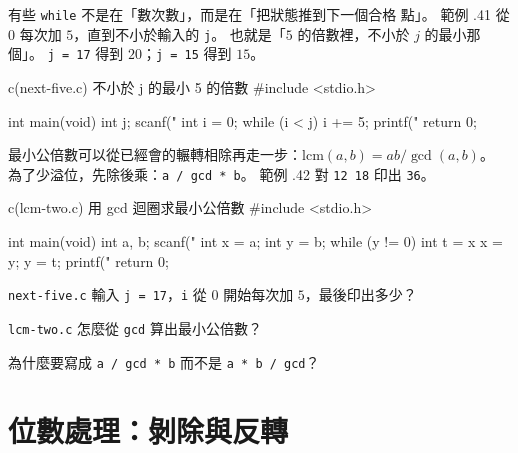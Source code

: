
有些 \texttt{while} 不是在「數次數」，而是在「把狀態推到下一個合格
點」。 範例 \thechapter.41 從 $0$ 每次加 $5$，直到不小於輸入的
\texttt{j}。 也就是「$5$ 的倍數裡，不小於 $j$ 的最小那個」。
\texttt{j = 17} 得到 $20$；\texttt{j = 15} 得到 $15$。

\begin{example}{c}{(next-five.c) 不小於 j 的最小 5 的倍數}
#include <stdio.h>

int main(void) {
    int j;
    scanf("%
    int i = 0;
    while (i < j) {
        i += 5;
    }
    printf("%
    return 0;
}
\end{example}


最小公倍數可以從已經會的輾轉相除再走一步：$\mathrm{lcm}(a,b) =
ab / \gcd(a,b)$。 為了少溢位，先除後乘：\texttt{a / gcd * b}。 範例
\thechapter.42 對 \texttt{12 18} 印出 \texttt{36}。

\begin{example}{c}{(lcm-two.c) 用 gcd 迴圈求最小公倍數}
#include <stdio.h>

int main(void) {
    int a, b;
    scanf("%
    int x = a;
    int y = b;
    while (y != 0) {
        int t = x %
        x = y;
        y = t;
    }
    printf("%
    return 0;
}
\end{example}


\begin{drills}[label=drills:loop-accum-variants]
\item \texttt{next-five.c} 輸入 \texttt{j = 17}，\texttt{i} 從 $0$
開始每次加 $5$，最後印出多少？
\item \texttt{lcm-two.c} 怎麼從 \texttt{gcd} 算出最小公倍數？
\item 為什麼要寫成 \texttt{a / gcd * b} 而不是 \texttt{a * b / gcd}？
\end{drills}

\section{位數處理：剝除與反轉}
\label{sec:loop-digits}

